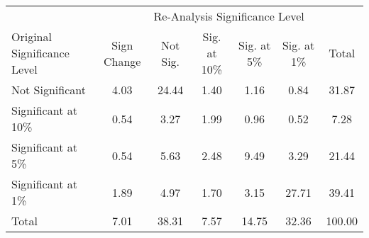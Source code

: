 \begin{tabular}{lcccccc}
\hline
\hline
 & \multicolumn{6}{c}{Re-Analysis Significance Level} \\
Original Significance Level&Sign Change&Not Sig.&Sig. at 10\%&Sig. at 5\%&Sig. at 1\%&Total \\
%
\hline
Not Significant&4.03&24.44&1.40&1.16&0.84&31.87 \\
Significant at 10\%&0.54&3.27&1.99&0.96&0.52&7.28 \\
Significant at 5\%&0.54&5.63&2.48&9.49&3.29&21.44 \\
Significant at 1\%&1.89&4.97&1.70&3.15&27.71&39.41 \\
Total&7.01&38.31&7.57&14.75&32.36&100.00 \\
\hline
\hline
\end{tabular}
